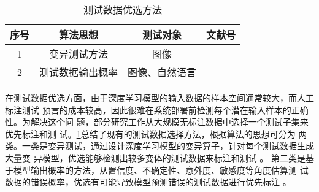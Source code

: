 \begin{table}[htp]
	\renewcommand\arraystretch{1.5}
	\small
	\centering
	\caption{测试数据优选方法}
	\label{tab:testingDataPri}
	\begin{tabular}{cccc}
		\toprule
		\textbf{序号} & \textbf{算法思想}  & \textbf{测试对象} & \textbf{文献号}                                                    \\
		\midrule
		1             & 变异测试方法       & 图像              & \cite{Wang2021Prioritizing}\cite{Ma2018DeepMutation}  \cite{Liu2022DeepState}                    \\
		2             & 测试数据输出概率       & 图像、自然语言  & \cite{Byun2019Input}\cite{Shen2020MultipleBoundary}\cite{Feng2020DeepGini}\cite{Hu2022AnEmpirical}\cite{Gao2022Adaptive} \\
		\bottomrule
	\end{tabular}
\end{table}

在测试数据优选方面，由于深度学习模型的输入数据的样本空间通常较大，而人工标注测试
预言的成本较高，因此很难在系统部署前检测每个潜在输入样本的正确性。为解决这个问
题，部分研究工作从大规模无标注数据中选择一个测试子集来优先标注和测
试。\cref{tab:testingDataPri}总结了现有的测试数据选择方法，根据算法的思想可分为
两类。一类是变异测试，通过设计深度学习模型的变异算子，针对每个测试数据生成大量变
异模型，优选能够检测出较多变体的测试数据来标注和测试
。
第二类是{基于模型输出概率}的方法，从置信度、不确定性、意外度、敏感度等角度估算测
试数据的错误概率，优选有可能导致模型预测错误的测试数据进行优先标注
。

